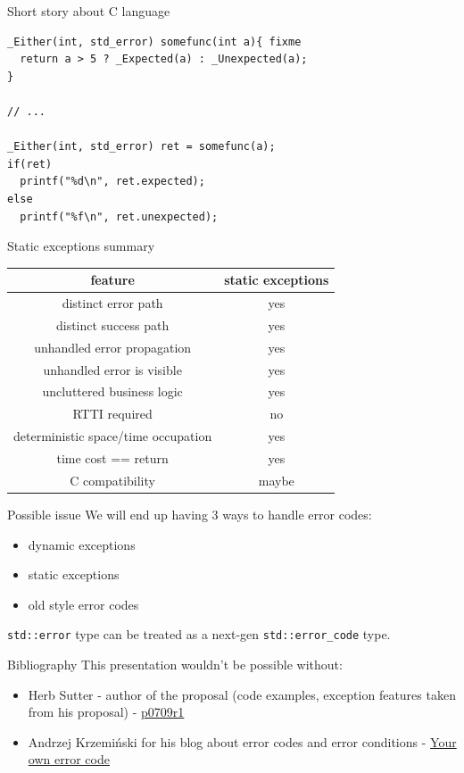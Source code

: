 \documentclass[10pt]{beamer}
\begin{document}
\begin{frame}[fragile]{Short story about C language}
	\begin{verbatim}
_Either(int, std_error) somefunc(int a){ fixme
  return a > 5 ? _Expected(a) : _Unexpected(a);
}

// ...

_Either(int, std_error) ret = somefunc(a);
if(ret)
  printf("%d\n", ret.expected);
else
  printf("%f\n", ret.unexpected);
	\end{verbatim}
\end{frame}

\begin{frame}{Static exceptions summary}
\centering
	\begin{tabular}{|c|c|}
		\hline
		feature & static exceptions \\ \hline \hline
		distinct error path & yes \\ \hline
		distinct success path & yes \\ \hline \hline
		unhandled error propagation & yes \\ \hline
		unhandled error is visible & yes \\ \hline
		uncluttered business logic & yes \\ \hline \hline
		RTTI required & no \\ \hline
		deterministic space/time occupation & yes \\ \hline
		time cost == return & yes \\ \hline \hline
		C compatibility & maybe \\ \hline
	\end{tabular}
\end{frame}

\begin{frame}{Possible issue}
	We will end up having 3 ways to handle error codes:
	\begin{itemize}
		\item dynamic exceptions
		\item static exceptions
		\item old style error codes
	\end{itemize}

	\vfill

	\texttt{std::error} type can be treated as a next-gen \texttt{std::error\_code} type.
\end{frame}

\begin{frame}{Bibliography}
	This presentation wouldn't be possible without:
	
	\begin{itemize}
		\item Herb Sutter - author of the proposal (code examples, exception features taken from his proposal) -  \href{http://www.open-std.org/jtc1/sc22/wg21/docs/papers/2018/p0709r1.pdf}{p0709r1}
		
		\item Andrzej Krzemiński for his blog about error codes and error conditions -  \href{https://akrzemi1.wordpress.com/2017/07/12/your-own-error-code/}{Your own error code}
	\end{itemize}
\end{frame}
\end{document}

